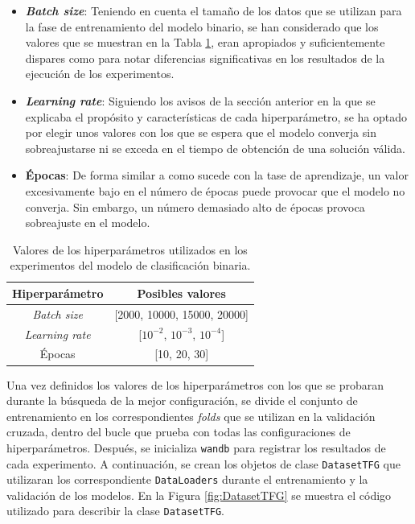 \begin{itemize}
	\item \textbf{\textit{Batch size}}: Teniendo en cuenta el tamaño de los datos que se utilizan para la fase de entrenamiento del modelo binario, se han considerado que los valores que se muestran en la Tabla \ref{tab:hiperBIN}, eran apropiados y suficientemente dispares como para notar diferencias significativas en los resultados de la ejecución de los experimentos.
	\item \textbf{\textit{Learning rate}}: Siguiendo los avisos de la sección anterior en la que se explicaba el propósito y características de cada hiperparámetro, se ha optado por elegir unos valores con los que se espera que el modelo converja sin sobreajustarse ni se exceda en el tiempo de obtención de una solución válida.
	\item \textbf{Épocas}: De forma similar a como sucede con la tase de aprendizaje, un valor excesivamente bajo en el número de épocas puede provocar que el modelo no converja. Sin embargo, un número demasiado alto de épocas provoca sobreajuste en el modelo.
\end{itemize}

\begin{table}[H]
\centering
\begin{tabular}{|c|c|}
\hline
\textbf{Hiperparámetro} & \textbf{Posibles valores} \\ \hline
\textit{Batch size} & [2000, 10000, 15000, 20000] \\ \hline
\textit{Learning rate} & [$10^{-2}$, $10^{-3}$, $10^{-4}$] \\ \hline
Épocas & [10, 20, 30] \\ \hline
\end{tabular}
\caption{Valores de los hiperparámetros utilizados en los experimentos del modelo de clasificación binaria.}
\label{tab:hiperBIN}
\end{table}

Una vez definidos los valores de los hiperparámetros con los que se probaran durante la búsqueda de la mejor configuración, se divide el conjunto de entrenamiento en los correspondientes \textit{folds} que se utilizan en la validación cruzada, dentro del bucle que prueba con todas las configuraciones de hiperparámetros. Después, se inicializa \texttt{wandb} para registrar los resultados de cada experimento. A continuación, se crean los objetos de clase \texttt{DatasetTFG} que utilizaran los correspondiente \texttt{DataLoaders}  durante el entrenamiento y la validación de los modelos. En la Figura \ref{fig:DatasetTFG} se muestra el código utilizado para describir la clase \texttt{DatasetTFG}. 


